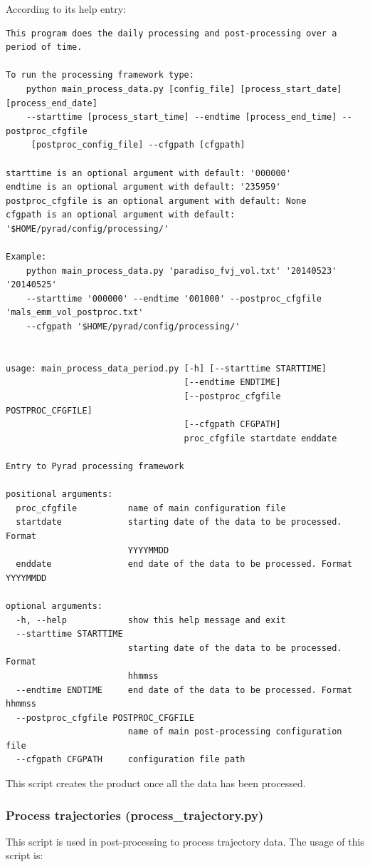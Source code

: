 \documentclass[a4paper,11pt,pdftex,twoside]{scrartcl}
\begin{document}
According to its help entry:
\begin{verbatim}
This program does the daily processing and post-processing over a period of time.

To run the processing framework type:
    python main_process_data.py [config_file] [process_start_date] [process_end_date]
    --starttime [process_start_time] --endtime [process_end_time] --postproc_cfgfile
     [postproc_config_file] --cfgpath [cfgpath]

starttime is an optional argument with default: '000000'
endtime is an optional argument with default: '235959'
postproc_cfgfile is an optional argument with default: None
cfgpath is an optional argument with default: '$HOME/pyrad/config/processing/'

Example:
    python main_process_data.py 'paradiso_fvj_vol.txt' '20140523' '20140525'
    --starttime '000000' --endtime '001000' --postproc_cfgfile 'mals_emm_vol_postproc.txt'
    --cfgpath '$HOME/pyrad/config/processing/'


usage: main_process_data_period.py [-h] [--starttime STARTTIME]
                                   [--endtime ENDTIME]
                                   [--postproc_cfgfile POSTPROC_CFGFILE]
                                   [--cfgpath CFGPATH]
                                   proc_cfgfile startdate enddate

Entry to Pyrad processing framework

positional arguments:
  proc_cfgfile          name of main configuration file
  startdate             starting date of the data to be processed. Format
                        YYYYMMDD
  enddate               end date of the data to be processed. Format YYYYMMDD

optional arguments:
  -h, --help            show this help message and exit
  --starttime STARTTIME
                        starting date of the data to be processed. Format
                        hhmmss
  --endtime ENDTIME     end date of the data to be processed. Format hhmmss
  --postproc_cfgfile POSTPROC_CFGFILE
                        name of main post-processing configuration file
  --cfgpath CFGPATH     configuration file path

\end{verbatim}

This script creates the product once all the data has been processed.

\subsubsection{Process trajectories (process\_trajectory.py)}
This script is used in post-processing to process trajectory data.
The usage of this script is:
\end{document}

